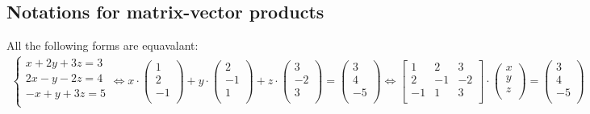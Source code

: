\documentclass[11pt, a4paper]{article}
\begin{document}
\subsection{Notations for matrix-vector products}
All the following forms are equavalant: 
\begin{align*}
  \begin{cases}
    x + 2y + 3z =3\\
    2x - y -2z = 4\\
    -x + y + 3z = 5\\
  \end{cases}
  \Leftrightarrow
  x \cdot \begin{pmatrix} 1\\ 2\\ -1\\ \end{pmatrix} +
    y \cdot \begin{pmatrix} 2\\ -1\\ 1\\ \end{pmatrix} +
    z \cdot \begin{pmatrix} 3\\ -2\\ 3\\ \end{pmatrix} =
    \begin{pmatrix} 3\\ 4\\ -5\\ \end{pmatrix}
  \Leftrightarrow
  \begin{bmatrix}
    1 & 2 & 3\\
    2 & -1 & -2\\
    -1 & 1 & 3\\
  \end{bmatrix}
  \cdot
  \begin{pmatrix} x\\ y\\ z\\ \end{pmatrix}
  =
  \begin{pmatrix} 3\\ 4\\ -5\\ \end{pmatrix}
\end{align*}
\end{document}
